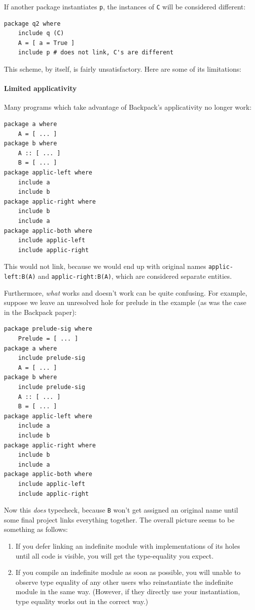 \documentclass{article}
\begin{document}
If another package instantiates \verb|p|, the instances of \verb|C| will
be considered different:

\begin{verbatim}
package q2 where
    include q (C)
    A = [ a = True ]
    include p # does not link, C's are different
\end{verbatim}

This scheme, by itself, is fairly unsatisfactory.  Here are some of its
limitations:

\paragraph{Limited applicativity}  Many programs which take advantage of
Backpack's applicativity no longer work:

\begin{verbatim}
package a where
    A = [ ... ]
package b where
    A :: [ ... ]
    B = [ ... ]
package applic-left where
    include a
    include b
package applic-right where
    include b
    include a
package applic-both where
    include applic-left
    include applic-right
\end{verbatim}

This would not link, because we would end up with original names
\verb|applic-left:B(A)| and \verb|applic-right:B(A)|, which are
considered separate entities.

Furthermore, \emph{what} works and doesn't work can be quite confusing.
For example, suppose we leave an unresolved hole for prelude in the example
(as was the case in the Backpack paper):

\begin{verbatim}
package prelude-sig where
    Prelude = [ ... ]
package a where
    include prelude-sig
    A = [ ... ]
package b where
    include prelude-sig
    A :: [ ... ]
    B = [ ... ]
package applic-left where
    include a
    include b
package applic-right where
    include b
    include a
package applic-both where
    include applic-left
    include applic-right
\end{verbatim}

Now this \emph{does} typecheck, because \verb|B| won't get assigned an
original name until some final project links everything together.  The
overall picture seems to be something as follows:

\begin{enumerate}
    \item If you defer linking an indefinite module with implementations
        of its holes until all code is visible, you will get the
        type-equality you expect.
    \item If you compile an indefinite module as soon as possible, you
        will unable to observe type equality of any other users who
        reinstantiate the indefinite module in the same way.  (However,
        if they directly use your instantiation, type equality works
        out in the correct way.)
\end{enumerate}
\end{document}
